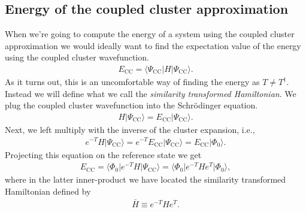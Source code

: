 \documentclass[
    a4paper, aps, twocolumn, floatfix, superscriptaddress,
    nofootinbib]{revtex4-1}
\newcommand{\1}{\mathds{1}}
\newcommand{\bra}[1]{\langle #1\lvert}
\newcommand{\ket}[1]{\rvert #1\rangle}
\newcommand{\kslat}{\ket{\Phi_0}}
\newcommand{\bslat}{\bra{\Phi_0}}
\newcommand{\kcc}{\ket{\Psi_{\text{CC}}}}
\newcommand{\bcc}{\bra{\Psi_{\text{CC}}}}
\newcommand{\ecc}{E_{\text{CC}}}
\begin{document}
    \subsection{Energy of the coupled cluster approximation}
        When we're going to compute the energy of a system using the coupled
        cluster approximation we would ideally want to find the expectation
        value of the energy using the coupled cluster wavefunction.
        \begin{align}
            \ecc = \bcc H\kcc.
        \end{align}
        As it turns out, this is an uncomfortable way of finding the energy
        as $T \neq T^{\dagger}$. Instead we will define what we call the
        \emph{similarity transformed Hamiltonian}. We plug the coupled
        cluster wavefunction into the Schrödinger equation.
        \begin{align}
            H\kcc = \ecc\kcc.
        \end{align}
        Next, we left multiply with the inverse of the cluster expansion,
        i.e.,
        \begin{align}
            e^{-T}H\kcc = e^{-T}\ecc\kcc
            = \ecc \kslat.
            \label{eq:clean_schrodinger}
        \end{align}
        Projecting this equation on the reference state we get
        \begin{align}
            \ecc = \bslat e^{-T}H\kcc
            = \bslat e^{-T}He^{T}\kslat,
        \end{align}
        where in the latter inner-product we have located the similarity
        transformed Hamiltonian defined by
        \begin{align}
            \bar{H} \equiv e^{-T}He^{T}.
            \label{eq:similarity_transformed_hamiltonian}
        \end{align}
\end{document}
